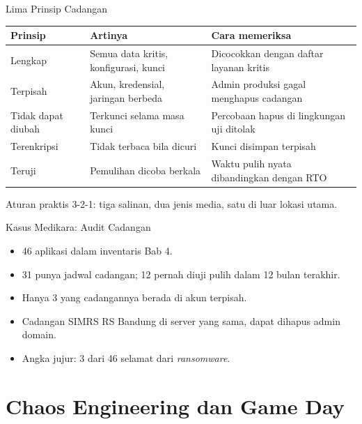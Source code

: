 \documentclass[aspectratio=169, table, 12pt]{beamer}
\begin{document}
\begin{frame}{{\Large Lima Prinsip Cadangan}}
  \scriptsize
  \begin{tabularx}{\textwidth}{>{\raggedright\arraybackslash}p{2.6cm}
      >{\raggedright\arraybackslash}X >{\raggedright\arraybackslash}X}
    \hline
    \textbf{Prinsip} & \textbf{Artinya} & \textbf{Cara memeriksa} \\
    \hline
    Lengkap & Semua data kritis, konfigurasi, kunci & Dicocokkan dengan daftar layanan kritis \\
    \hline
    Terpisah & Akun, kredensial, jaringan berbeda & Admin produksi gagal menghapus cadangan \\
    \hline
    Tidak dapat diubah & Terkunci selama masa kunci & Percobaan hapus di lingkungan uji ditolak
      \\
    \hline
    Terenkripsi & Tidak terbaca bila dicuri & Kunci disimpan terpisah \\
    \hline
    Teruji & Pemulihan dicoba berkala & Waktu pulih nyata dibandingkan dengan RTO \\
    \hline
  \end{tabularx}

  \vspace{8pt}
  \small Aturan praktis 3-2-1: tiga salinan, dua jenis media, satu di luar lokasi utama.
\end{frame}

\begin{frame}{{\Large Kasus Medikara: Audit Cadangan}}
  \vspace{6pt}
  \small
  \begin{itemize}
    \item 46 aplikasi dalam inventaris Bab 4.
    \item 31 punya jadwal cadangan; 12 pernah diuji pulih dalam 12 bulan terakhir.
    \item Hanya 3 yang cadangannya berada di akun terpisah.
    \item Cadangan SIMRS RS Bandung di server yang sama, dapat dihapus admin domain.
    \item Angka jujur: 3 dari 46 selamat dari \textit{ransomware}.
  \end{itemize}
\end{frame}

\section{Chaos Engineering dan Game Day}
\end{document}
